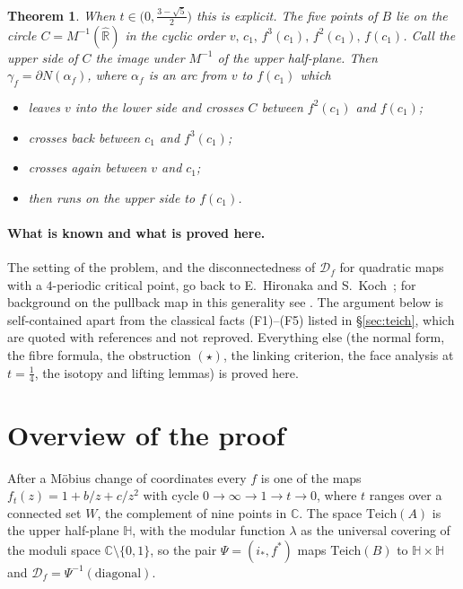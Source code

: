 \documentclass[11pt]{article}
\newtheorem{theorem}{Theorem}
\theoremstyle{definition}
\newcommand{\Teich}{\mathrm{Teich}}
\newcommand{\Rh}{\hat{\mathbb R}}
\newcommand{\HH}{\mathbb H}
\newcommand{\D}{\mathcal D}
\begin{document}
\begin{theorem}
When $t\in\bigl(0,\tfrac{3-\sqrt5}{2}\bigr)$ this is explicit. The five points of $B$ lie on the circle $C=M^{-1}(\Rh)$ in the cyclic order $v,\,c_1,\,f^3(c_1),\,f^2(c_1),\,f(c_1)$. Call the \emph{upper} side of $C$ the image under $M^{-1}$ of the upper half-plane. Then $\gamma_f=\partial N(\alpha_f)$, where $\alpha_f$ is an arc from $v$ to $f(c_1)$ which
\begin{itemize}[nosep]
\item leaves $v$ into the lower side and crosses $C$ between $f^2(c_1)$ and $f(c_1)$;
\item crosses back between $c_1$ and $f^3(c_1)$;
\item crosses again between $v$ and $c_1$;
\item then runs on the upper side to $f(c_1)$.
\end{itemize}
\end{theorem}

\paragraph{What is known and what is proved here.} The setting of the problem, and the disconnectedness of $\D_f$ for quadratic maps with a $4$-periodic critical point, go back to E.~Hironaka and S.~Koch~\cite{HK}; for background on the pullback map in this generality see \cite{DH,BEKP}. The argument below is self-contained apart from the classical facts (F1)--(F5) listed in \S\ref{sec:teich}, which are quoted with references and not reproved. Everything else (the normal form, the fibre formula, the obstruction $(\star)$, the linking criterion, the face analysis at $t=\tfrac14$, the isotopy and lifting lemmas) is proved here.

\section{Overview of the proof}

After a M\"obius change of coordinates every $f$ is one of the maps $f_t(z)=1+b/z+c/z^2$ with cycle $0\to\infty\to1\to t\to0$, where $t$ ranges over a connected set $W$, the complement of nine points in $\mathbb C$. The space $\Teich(A)$ is the upper half-plane $\HH$, with the modular function $\lambda$ as the universal covering of the moduli space $\mathbb C\setminus\{0,1\}$, so the pair $\Psi=(i_*,f^*)$ maps $\Teich(B)$ to $\HH\times\HH$ and $\D_f=\Psi^{-1}(\text{diagonal})$.
\end{document}
